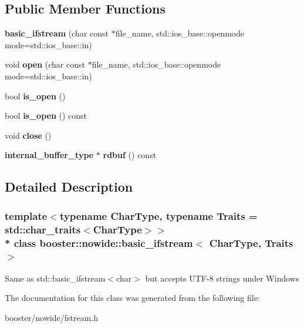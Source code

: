 \subsection*{Public Member Functions}
\begin{DoxyCompactItemize}
\item 
{\bfseries basic\+\_\+ifstream} (char const $\ast$file\+\_\+name, std\+::ios\+\_\+base\+::openmode mode=std\+::ios\+\_\+base\+::in)\label{classbooster_1_1nowide_1_1basic__ifstream_a349a1df7d87c85422e67574d8d0f17ab}

\item 
void {\bfseries open} (char const $\ast$file\+\_\+name, std\+::ios\+\_\+base\+::openmode mode=std\+::ios\+\_\+base\+::in)\label{classbooster_1_1nowide_1_1basic__ifstream_a09b6a2cb66805759abd7c130e18b5896}

\item 
bool {\bfseries is\+\_\+open} ()\label{classbooster_1_1nowide_1_1basic__ifstream_a5ab0ecf734809cf43f3753783e797357}

\item 
bool {\bfseries is\+\_\+open} () const \label{classbooster_1_1nowide_1_1basic__ifstream_aaba31ae640976c974c60f1e560379007}

\item 
void {\bfseries close} ()\label{classbooster_1_1nowide_1_1basic__ifstream_af39fe9e62c854ea5ba2333d469a6cf79}

\item 
{\bf internal\+\_\+buffer\+\_\+type} $\ast$ {\bfseries rdbuf} () const \label{classbooster_1_1nowide_1_1basic__ifstream_a1ac8e4f67a2f66b6be0ac15a20c078ae}

\end{DoxyCompactItemize}


\subsection{Detailed Description}
\subsubsection*{template$<$typename Char\+Type, typename Traits = std\+::char\+\_\+traits$<$\+Char\+Type$>$$>$\\*
class booster\+::nowide\+::basic\+\_\+ifstream$<$ Char\+Type, Traits $>$}

Same as std\+::basic\+\_\+ifstream$<$char$>$ but accepts U\+T\+F-\/8 strings under Windows 

The documentation for this class was generated from the following file\+:\begin{DoxyCompactItemize}
\item 
booster/nowide/fstream.\+h\end{DoxyCompactItemize}
